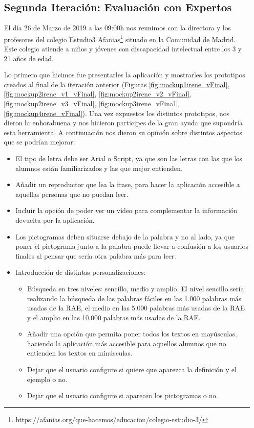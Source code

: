 	 
\subsection{Segunda Iteración: Evaluación con Expertos}
\label{cap:subsec:evaluacionExpertos}

El día 26 de Marzo de 2019 a las 09:00h nos reunimos con la directora y los profesores del colegio Estudio3 Afanias\footnote{https://afanias.org/que-hacemos/educacion/colegio-estudio-3/} situado en la Comunidad de Madrid. Este colegio atiende a niños y jóvenes con discapacidad intelectual entre los 3 y 21 años de edad.

Lo primero que hicimos fue presentarles la aplicación y mostrarles los prototipos creados al final de la iteración anterior (Figuras \ref{fig:mockup1irene_vFinal}, \ref{fig:mockup2irene_v1_vFinal}, \ref{fig:mockup2irene_v2_vFinal}, \ref{fig:mockup2irene_v3_vFinal}, \ref{fig:mockup3irene_vFinal}, \ref{fig:mockup4irene_vFinal}).
Una vez expuestos los distintos prototipos, nos dieron la enhorabuena y nos hicieron participes de la gran ayuda que supondría esta herramienta. A continuación nos dieron su opinión sobre distintos aspectos que se podrían mejorar:

\begin{itemize} 

	\item El tipo de letra debe ser Arial o Script, ya que son las letras con las que los alumnos están familiarizados y las que mejor entienden.
	\item Añadir un reproductor que lea la frase, para hacer la aplicación accesible a aquellas personas que no puedan leer.
	\item Incluir la opción de poder ver un vídeo para complementar la información devuelta por la aplicación.
	\item Los pictogramas deben situarse debajo de la palabra y no al lado, ya que poner el pictograma junto a la palabra puede llevar a confusión a los usuarios finales al pensar que sería otra palabra más para leer. 
	\item Introducción de distintas personalizaciones:
	\begin{itemize}
		\item Búsqueda en tres niveles: sencillo, medio y amplio. El nivel sencillo sería realizando la búsqueda de las palabras fáciles en las 1.000 palabras más usadas de la RAE, el medio en las 5.000 palabras más usadas de la RAE y el amplio en las 10.000 palabras más usadas de la RAE. 
		\item Añadir una opción que permita poner todos los textos en mayúsculas, haciendo la aplicación más accesible para aquellos alumnos que no entienden los textos en minúsculas.
		\item Dejar que el usuario configure si quiere que aparezca la definición y el ejemplo o no.
		\item Dejar que el usuario configure  si aparecen los pictogramas o no.
	\end{itemize}
\end{itemize}


